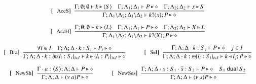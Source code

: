 \begin{figure}[!t]
\[\begin{array}{c}
		\trule{AccS}~~\tree{
			\Gamma; \emptyset; \emptyset \proves k \hastype \chtype{S}
			\quad
			\Gamma; \Lambda_1; \Delta_1 \proves P \hastype \Proc
			\quad
			\Gamma; \Lambda_2; \Delta_2 \proves x \hastype S
		}{
			\Gamma; \Lambda_1 \backslash \Lambda_2; \Delta_1 \backslash \Delta_2 \proves \binp{k}{x} P \hastype \Proc
		}
		\\[6mm]

		\trule{AccH}~~\tree{
			\Gamma; \emptyset; \emptyset \proves k \hastype \chtype{L}
			\quad
			\Gamma; \Lambda_1; \Delta_1 \proves P \hastype \Proc
			\quad
			\Gamma; \Lambda_2; \Delta_2 \proves X \hastype L
		}{
			\Gamma; \Lambda_1 \backslash \Lambda_2; \Delta_1 \backslash \Delta_2 \proves \binp{k}{X} P \hastype \Proc
		}
		\\[6mm]

		\trule{Bra}~~\tree{
			 \forall i \in I \quad \Gamma; \Lambda; \Delta \cat k:S_i \proves P_i \hastype \Proc
		}{
			\Gamma; \Lambda; \Delta \cat k: \btbra{l_i:S_i}_{i \in I} \proves \bbra{k}{l_i:P_i}_{i \in I}\hastype \Proc
		}
		\qquad\quad 
	 	\trule{Sel}~~\tree{
			\Gamma; \Lambda; \Delta \cat k: S_j  \proves P \hastype \Proc \quad j \in I
		}{
			\Gamma; \Lambda; \Delta \cat k:\btsel{l_i:S_i}_{i \in I} \proves \bsel{k}{l_j} P \hastype \Proc
		}
		\\[6mm]

%

		\trule{NewSh}~~\tree{
			\Gamma\cat a:\chtype{S} ; \Lambda; \Delta \proves P \hastype \Proc
		}{
			\Gamma; \Lambda; \Delta \proves \news{a} P \hastype \Proc}
		\qquad\quad
		\trule{NewSes}~~\tree{
			\Gamma; \Lambda; \Delta \cat s:S_1 \cat \dual{s}: S_2 \proves P \hastype \Proc \quad S_1 \dualof S_2
		}{
			\Gamma; \Lambda; \Delta \proves \news{s} P \hastype \Proc
		}
		\\[6mm]


\end{array}\]
\end{figure}
